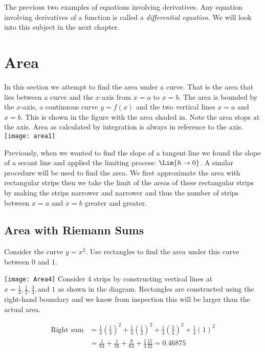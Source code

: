 The previous two examples of equations involving derivatives. Any equation involving derivatives of a function is called a \emph{differential equation}. We will look into this subject in the next chapter. 

\clearpage
\section{Area}\begin{multicols}{2}
In this section we attempt to find the area under a curve. That is the area that lies between a curve and the $x$-axis from $x =a$ to $x =b$. The area is bounded by the $x$-axis, a continuous curve $y =f (x)$ and the two vertical lines $x =a$ and $x =b$. This is shown in the figure with the area shaded in. Note the area stops at the axis. Area as calculated by integration is always in reference to the axis.\\
\texttt{[image: area1]}
\end{multicols}

Previously, when we wanted to find the slope of a tangent line we found the slope of a secant line and applied the limiting process: $\Lim{h\to 0}$. A similar procedure will be used to find the area. We first approximate the area with rectangular strips then we take the limit of the areas of these rectangular strips by making the strips narrower and narrower and thus the number of strips between $x =a$ and $x =b$ greater and greater. 

\subsection*{Area with Riemann Sums}
\example Consider the curve $y =x^{2}$. Use rectangles to find the area under this curve between $0$ and $1$. 

\solution 
\begin{multicols}{2}
\texttt{[image: Area4]}
Consider $4$ strips by constructing vertical lines at $x =\frac{1}{4}, \frac{1}{2}, \frac{3}{4}, \text{and }1$ as shown in the diagram. Rectangles are constructed using the right-hand boundary and we know from inspection this will be larger than the actual area.
\end{multicols}
\begin{align*}
\text{Right sum} &  = \frac{1}{4} \genfrac{(}{)}{}{}{1}{4}^{2} +\frac{1}{4} \genfrac{(}{)}{}{}{1}{2}^{2} +\frac{1}{4} \genfrac{(}{)}{}{}{3}{4}^{2} +\frac{1}{4} \left (1\right )^{2} \\
 &  = \frac{1}{64} +\frac{1}{16} +\frac{9}{64} +\frac{1}{4} \frac{15}{32} =0.46875\end{align*}

